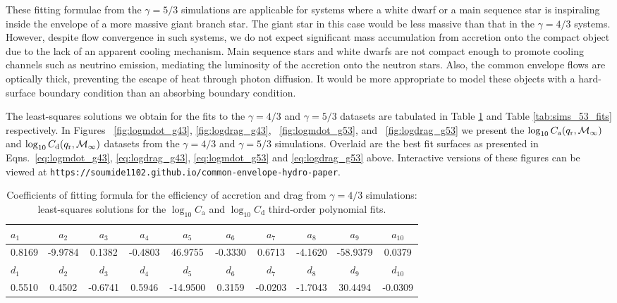 These fitting formulae from the $\gamma = 5/3$ simulations are applicable for systems where a white dwarf or a main sequence star is inspiraling inside the envelope of a more massive giant branch star. The giant star in this case would be less massive than that in the $\gamma = 4/3$ systems. However, despite flow convergence in such systems, we do not expect significant mass accumulation from accretion onto the compact object due to the lack of an apparent cooling mechanism. Main sequence stars and white dwarfs are not compact enough to promote cooling channels such as neutrino emission, mediating the luminosity of the accretion onto the neutron stars. Also, the common envelope flows are optically thick, preventing the escape of heat through photon diffusion. It would be more appropriate to model these objects with a hard-surface boundary condition than an absorbing boundary condition.

The least-squares solutions we obtain for the fits to the $\gamma = 4/3$ and $\gamma = 5/3$ datasets are tabulated in Table \ref{tab:sims_43_fits} and Table \ref{tab:sims_53_fits} respectively. In Figures ~\ref{fig:logmdot_g43}, \ref{fig:logdrag_g43}, ~\ref{fig:logmdot_g53}, and ~\ref{fig:logdrag_g53} we present the $\log_{10}C_{\mathrm a} (q_{\rm r}, \mathcal{M}_\infty)$ and $\log_{10}C_{\mathrm d} (q_{\rm r}, \mathcal{M}_\infty)$ datasets from the $\gamma = 4/3$ and $\gamma = 5/3$ simulations. Overlaid are the best fit surfaces as presented in Eqns.~\ref{eq:logmdot_g43}, \ref{eq:logdrag_g43}, \ref{eq:logmdot_g53} and \ref{eq:logdrag_g53} above. Interactive versions of these figures can be viewed at \verb"https://soumide1102.github.io/common-envelope-hydro-paper".

\begin{table}[h]
\centering
\begin{adjustwidth}{-1.5cm}{}
\begin{tabular}{lccccccccc} 
\hline\hline
\rule{0pt}{3ex}
$a_1$ & $a_2$ & $a_3$ & $a_4$ & $a_5$ & $a_6$ & $a_7$ & $a_8$ & $a_9$ & $a_{10}$ \\
\hline
\rule{0pt}{3ex}%
\vspace*{0.1cm}
0.8169 & -9.9784 & 0.1382 & -0.4803 & 46.9755 & -0.3330 & 0.6713 & -4.1620 & -58.9379 & 0.0379 \\
\hline\hline
\rule{0pt}{3ex}
$d_1$ & $d_2$ & $d_3$ & $d_4$ & $d_5$ & $d_6$ & $d_7$ & $d_8$ & $d_9$ & $d_{10}$ \\
\hline
\rule{0pt}{3ex}%
\vspace*{0.1cm}
0.5510 & 0.4502 & -0.6741 & 0.5946 & -14.9500 & 0.3159 & -0.0203 & -1.7043 & 30.4494 & -0.0309 \\
\hline
\end{tabular}
\caption{Coefficients of fitting formula for the efficiency of accretion and drag from $\gamma = 4/3$ simulations: least-squares solutions for the $\log_{10} C_{\mathrm a}$ and $\log_{10} C_{\mathrm d}$ third-order polynomial fits.}
\label{tab:sims_43_fits}
\end{adjustwidth}
\end{table}

